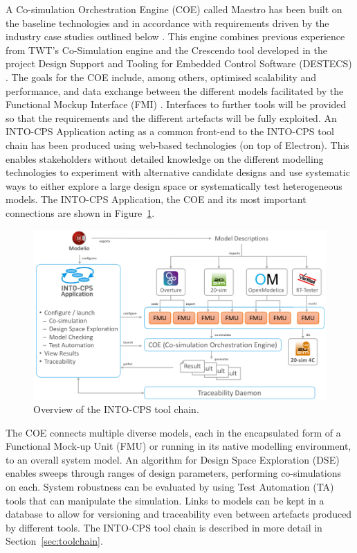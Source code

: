 A Co-simulation Orchestration Engine (COE) called Maestro has been built on the baseline technologies and in accordance with requirements driven by the industry case studies outlined below \cite{Thule&17}. This engine combines previous experience from TWT's Co-Simulation engine and the Crescendo tool developed in the project Design Support and Tooling for Embedded Control Software (DESTECS) \cite{Broenink&10}. The goals for the COE include, among others, optimised scalability and performance, and data exchange between the different models facilitated by the Functional Mockup Interface (FMI) \cite{FMIStandard2.0}. Interfaces to further tools will be provided so that the requirements and the different artefacts will be fully exploited. An INTO-CPS Application acting as a common front-end to the INTO-CPS tool chain has been produced using web-based technologies (on top of Electron). This enables stakeholders without detailed knowledge on the different modelling technologies to experiment with alternative candidate designs and use systematic ways to either explore a large design space or systematically test heterogeneous models. The INTO-CPS Application, the COE and its most important connections are shown in Figure~\ref{fig:toolchain}. 
 
\begin{figure}[ht]
\centering
\includegraphics[width=\textwidth]{./figures/toolchain}
\caption{Overview of the INTO-CPS tool chain.}
\label{fig:toolchain}
\end{figure}

The COE connects multiple diverse models, each in the encapsulated form of a Functional Mock-up Unit (FMU) or running in its native modelling environment, to an overall system model. An algorithm for Design Space Exploration (DSE) enables sweeps through ranges of design parameters, performing co-simulations on each. System robustness can be evaluated by using Test Automation (TA) tools that can manipulate the simulation. Links to models can be kept in a database to allow for versioning and traceability even between artefacts produced by different tools. The INTO-CPS tool chain is described in more detail in Section~\ref{sec:toolchain}.


